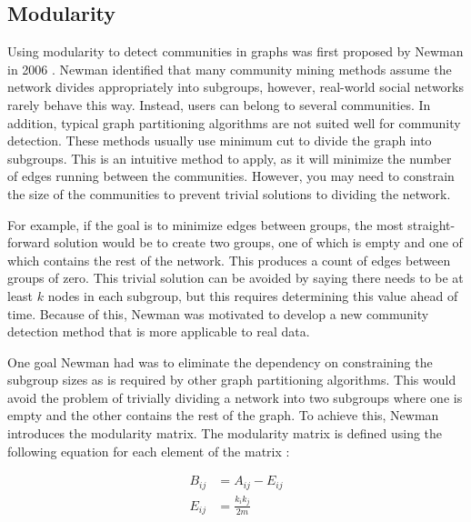 \documentclass{article}
\begin{document}
    \subsection{Modularity}
    Using modularity to detect communities in graphs was first proposed by Newman in 2006 \cite{Newman2006}. Newman identified that many community mining methods assume the network divides appropriately into subgroups, however, real-world social networks rarely behave this way. Instead, users can belong to several communities. In addition, typical graph partitioning algorithms are not suited well for community detection. These methods usually use minimum cut to divide the graph into subgroups. This is an intuitive method to apply, as it will minimize the number of edges running between the communities. However, you may need to constrain the size of the communities to prevent trivial solutions to dividing the network.
    \par
    For example, if the goal is to minimize edges between groups, the most straight-forward solution would be to create two groups, one of which is empty and one of which contains the rest of the network. This produces a count of edges between groups of zero. This trivial solution can be avoided by saying there needs to be at least $k$ nodes in each subgroup, but this requires determining this value ahead of time. Because of this, Newman was motivated to develop a new community detection method that is more applicable to real data.
    \par
    One goal Newman had was to eliminate the dependency on constraining the subgroup sizes as is required by other graph partitioning algorithms. This would avoid the problem of trivially dividing a network into two subgroups where one is empty and the other contains the rest of the graph. To achieve this, Newman introduces the modularity matrix. The modularity matrix is defined using the following equation for each element of the matrix \cite{Newman2006}:

    \begin{align}
        B_{ij} &= A_{ij} - E_{ij} \\
        E_{ij} &= \frac{k_ik_j}{2m}
    \end{align}
\end{document}
